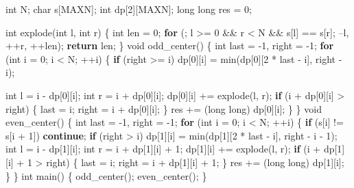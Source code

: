 \documentclass[10pt,]{article}
\newenvironment{Shaded}{}{}
\newcommand{\KeywordTok}[1]{\textcolor[rgb]{0.00,0.44,0.13}{\textbf{{#1}}}}
\newcommand{\DataTypeTok}[1]{\textcolor[rgb]{0.56,0.13,0.00}{{#1}}}
\newcommand{\DecValTok}[1]{\textcolor[rgb]{0.25,0.63,0.44}{{#1}}}
\newcommand{\NormalTok}[1]{{#1}}
\begin{document}
\begin{Shaded}
\begin{Highlighting}[]
\DataTypeTok{int} \NormalTok{N;}
\DataTypeTok{char} \NormalTok{s[MAXN];}
\DataTypeTok{int} \NormalTok{dp[}\DecValTok{2}\NormalTok{][MAXN];}
\DataTypeTok{long} \DataTypeTok{long} \NormalTok{res = }\DecValTok{0}\NormalTok{;}

\DataTypeTok{int} \NormalTok{explode(}\DataTypeTok{int} \NormalTok{l, }\DataTypeTok{int} \NormalTok{r) \{}
  \DataTypeTok{int} \NormalTok{len = }\DecValTok{0}\NormalTok{;}
  \KeywordTok{for} \NormalTok{(; l >= }\DecValTok{0} \NormalTok{&& r < N && s[l] == s[r]; --l, ++r, ++len);}
  \KeywordTok{return} \NormalTok{len;}
\NormalTok{\}}
\DataTypeTok{void} \NormalTok{odd_center() \{}
  \DataTypeTok{int} \NormalTok{last = -}\DecValTok{1}\NormalTok{, right = -}\DecValTok{1}\NormalTok{;}
  \KeywordTok{for} \NormalTok{(}\DataTypeTok{int} \NormalTok{i = }\DecValTok{0}\NormalTok{; i < N; ++i) \{}
    \KeywordTok{if} \NormalTok{(right >= i)}
      \NormalTok{dp[}\DecValTok{0}\NormalTok{][i] = min(dp[}\DecValTok{0}\NormalTok{][}\DecValTok{2} \NormalTok{* last - i], right - i);}

    \DataTypeTok{int} \NormalTok{l = i - dp[}\DecValTok{0}\NormalTok{][i];}
    \DataTypeTok{int} \NormalTok{r = i + dp[}\DecValTok{0}\NormalTok{][i];}
    \NormalTok{dp[}\DecValTok{0}\NormalTok{][i] += explode(l, r);}
    \KeywordTok{if} \NormalTok{(i + dp[}\DecValTok{0}\NormalTok{][i] > right) \{}
      \NormalTok{last = i;}
      \NormalTok{right = i + dp[}\DecValTok{0}\NormalTok{][i];}
    \NormalTok{\}}
    \NormalTok{res += (}\DataTypeTok{long} \DataTypeTok{long}\NormalTok{) dp[}\DecValTok{0}\NormalTok{][i];}
  \NormalTok{\}}
\NormalTok{\}}
\DataTypeTok{void} \NormalTok{even_center() \{}
  \DataTypeTok{int} \NormalTok{last = -}\DecValTok{1}\NormalTok{, right = -}\DecValTok{1}\NormalTok{;}
  \KeywordTok{for} \NormalTok{(}\DataTypeTok{int} \NormalTok{i = }\DecValTok{0}\NormalTok{; i < N; ++i) \{}
    \KeywordTok{if} \NormalTok{(s[i] != s[i + }\DecValTok{1}\NormalTok{])}
      \KeywordTok{continue}\NormalTok{;}
    \KeywordTok{if} \NormalTok{(right > i)}
      \NormalTok{dp[}\DecValTok{1}\NormalTok{][i] = min(dp[}\DecValTok{1}\NormalTok{][}\DecValTok{2} \NormalTok{* last - i], right - i - }\DecValTok{1}\NormalTok{);}
    \DataTypeTok{int} \NormalTok{l = i - dp[}\DecValTok{1}\NormalTok{][i];}
    \DataTypeTok{int} \NormalTok{r = i + dp[}\DecValTok{1}\NormalTok{][i] + }\DecValTok{1}\NormalTok{;}
    \NormalTok{dp[}\DecValTok{1}\NormalTok{][i] += explode(l, r);}
    \KeywordTok{if} \NormalTok{(i + dp[}\DecValTok{1}\NormalTok{][i] + }\DecValTok{1} \NormalTok{> right) \{}
      \NormalTok{last = i;}
      \NormalTok{right = i + dp[}\DecValTok{1}\NormalTok{][i] + }\DecValTok{1}\NormalTok{;}
    \NormalTok{\}}
    \NormalTok{res += (}\DataTypeTok{long} \DataTypeTok{long}\NormalTok{) dp[}\DecValTok{1}\NormalTok{][i];}
  \NormalTok{\}}
\NormalTok{\}}
\DataTypeTok{int} \NormalTok{main() \{}
  \NormalTok{odd_center();}
  \NormalTok{even_center();}
\NormalTok{\}}
\end{Highlighting}
\end{Shaded}
\end{document}
